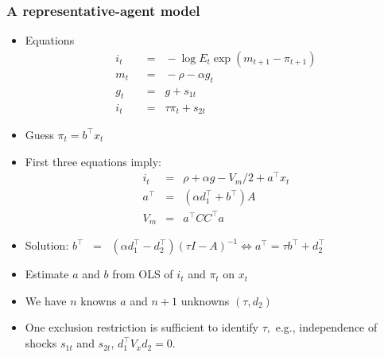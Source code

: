 \documentclass[handout]{beamer}
\begin{document}
\begin{frame}
\frametitle{A representative-agent model}
\begin{footnotesize}
\begin{itemize} %
\item Equations %
\begin{align*}
    i_t &\;\;=\;\; - \log E_t \exp(m_{t+1}-\pi_{t+1}) \tag{Euler/Fisher equation} \\
        m_t &\;\;=\;\;  - \rho - \alpha g_t  \tag{Pricing kernel}\\
            g_t &\;\;=\;\;  g + s_{1t}  \tag{Consumption growth / output gap} \\
    i_t &\;\;=\;\;  \tau \pi_{t} + s_{2t} \tag{Taylor rule}
\end{align*}
\pause
\item Guess $\pi_t=b^\top x_t$
\item First three equations imply:
\begin{eqnarray*}
   i_t &=&  \rho+\alpha g - V_m/2  + a^\top x_t \\
    a^\top &=& (\alpha d_1^\top + b^\top)  A  \\
    V_m     &=& a^\top C C^\top a
\end{eqnarray*}
\item Solution: $b^\top \;\;=\;\; (\alpha d_1^\top - d_2^\top) (\tau I -  A )^{-1} \Leftrightarrow     a^\top = \tau b^\top + d_2^\top$
\item Estimate $a$ and $b$ from OLS of $i_t$ and $\pi_t$ on $x_t$
 \item We have $n$ knowns $a$ and $n+1$ unknowns  $(\tau,d_2)$
 \item One exclusion restriction is sufficient to identify $\tau,$ e.g., independence of shocks $s_{1t}$ and $s_{2t}$, $d_1^{\top}V_x d_2=0.$
\end{itemize}
\end{footnotesize}
\end{frame}
\end{document}
